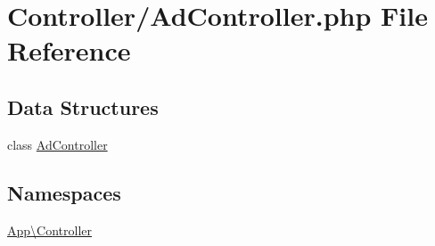 \hypertarget{_ad_controller_8php}{}\section{Controller/\+Ad\+Controller.php File Reference}
\label{_ad_controller_8php}
\subsection*{Data Structures}
\begin{DoxyCompactItemize}
\item 
class \mbox{\hyperlink{class_app_1_1_controller_1_1_ad_controller}{Ad\+Controller}}
\end{DoxyCompactItemize}
\subsection*{Namespaces}
\begin{DoxyCompactItemize}
\item 
 \mbox{\hyperlink{namespace_app_1_1_controller}{App\textbackslash{}\+Controller}}
\end{DoxyCompactItemize}
